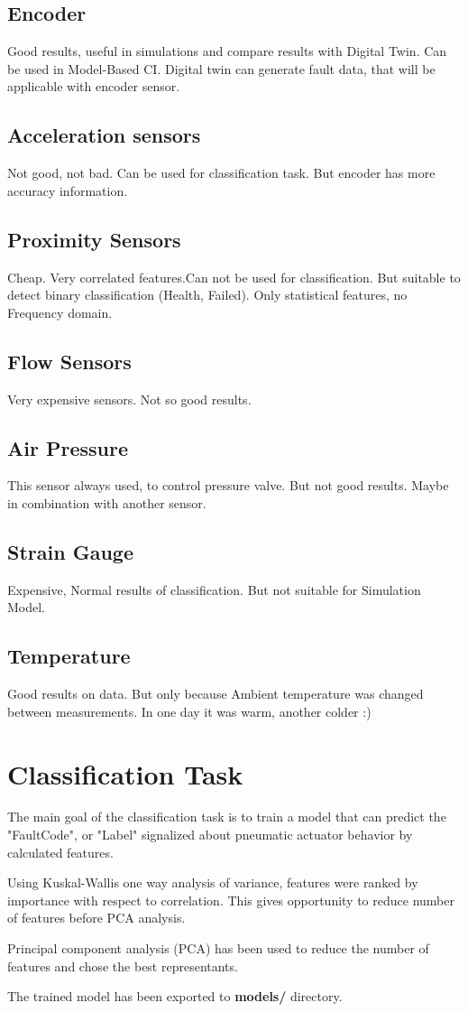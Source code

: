 \subsection{Encoder}
Good results, useful in simulations and compare results with Digital Twin.
Can be used in Model-Based CI. 
Digital twin can generate fault data, that will be applicable with encoder
sensor.

\subsection{Acceleration sensors}
Not good, not bad. Can be used for classification task. But encoder has
more accuracy information.

\subsection{Proximity Sensors}
Cheap. Very correlated features.Can not be used for classification. But suitable
to detect binary classification (Health, Failed).
Only statistical features, no Frequency domain.

\subsection{Flow Sensors}
Very expensive sensors. Not so good results.

\subsection{Air Pressure}
This sensor always used, to control pressure valve. But not good results.
Maybe in combination with another sensor.

\subsection{Strain Gauge}
Expensive, Normal results of classification. But not suitable for
Simulation Model.

\subsection{Temperature}
Good results on data. But only because Ambient temperature was changed
between measurements. In one day it was warm, another colder :)


\section{Classification Task}

The main goal of the classification task is to train a model that can
predict the "FaultCode", or "Label" signalized about pneumatic actuator behavior by
calculated features.

Using Kuskal-Wallis one way analysis of variance, features were ranked by
importance with respect to correlation. This gives opportunity to reduce
number of features before PCA analysis.

Principal component analysis (PCA) has been used to reduce the number of
features and chose the best representants.

The trained model has been exported to \textbf{models/} directory.

